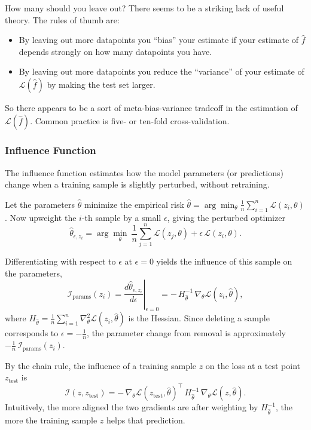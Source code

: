 How many should you leave out? There seems to be a striking lack of
useful theory. The rules of thumb are:
\begin{itemize}
  \item By leaving out more datapoints you ``bias'' your estimate
        if your estimate of $\hat{f}$ depends strongly on how many
        datapoints you have.
  \item By leaving out more datapoints you reduce the ``variance''
        of your estimate of $\mathcal{L}(\hat{f})$ by making the
        test set larger.
\end{itemize}
So there appears to be a sort of meta-bias-variance tradeoff in the
estimation of $\mathcal{L}(\hat{f})$. Common practice is five- or
ten-fold cross-validation.

\subsubsection{Influence Function}
The influence function estimates how the model parameters (or predictions)
change when a training sample is slightly perturbed, without retraining.

Let the parameters $\hat\theta$ minimize the empirical risk
$\hat\theta = \arg\min_{\theta} \frac{1}{n}\sum_{i=1}^{n} \mathcal{L}(z_i,\theta)$.
Now upweight the $i$-th sample by a small $\epsilon$, giving the perturbed
optimizer
\[
  \hat\theta_{\epsilon,z_i}
  = \arg\min_{\theta}\ \frac{1}{n}\sum_{j=1}^{n} \mathcal{L}(z_j,\theta)+\epsilon\,\mathcal{L}(z_i,\theta).
\]

Differentiating with respect to $\epsilon$ at $\epsilon=0$ yields the influence
of this sample on the parameters,
\[
  \mathcal{I}_{\text{params}}(z_i)
  = \left.\frac{d\hat\theta_{\epsilon,z_i}}{d\epsilon}\right|_{\epsilon=0}
  = -\,H_{\hat\theta}^{-1}\,\nabla_\theta \mathcal{L}(z_i,\hat\theta),
\]
where $H_{\hat\theta}=\frac{1}{n}\sum_{i=1}^{n}\nabla_\theta^2 \mathcal{L}(z_i,\hat\theta)$
is the Hessian. Since deleting a sample corresponds to $\epsilon=-\tfrac{1}{n}$,
the parameter change from removal is approximately
$-\tfrac{1}{n}\,\mathcal{I}_{\text{params}}(z_i)$.

By the chain rule, the influence of a training sample $z$ on the loss at a test
point $z_{\text{test}}$ is
\[
  \mathcal{I}(z,z_{\text{test}})
  = -\,\nabla_\theta \mathcal{L}(z_{\text{test}},\hat\theta)^{\top}\,
       H_{\hat\theta}^{-1}\,
       \nabla_\theta \mathcal{L}(z,\hat\theta).
\]
Intuitively, the more aligned the two gradients are after weighting by
$H_{\hat\theta}^{-1}$, the more the training sample $z$ helps that prediction.


